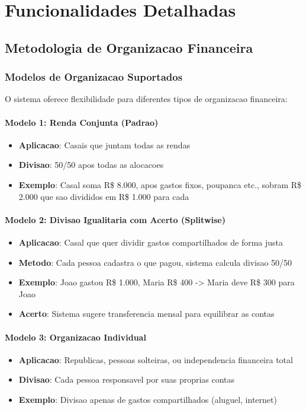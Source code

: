\section{Funcionalidades Detalhadas}

\subsection{Metodologia de Organizacao Financeira}

\subsubsection{Modelos de Organizacao Suportados}
O sistema oferece flexibilidade para diferentes tipos de organizacao financeira:

\paragraph{Modelo 1: Renda Conjunta (Padrao)}
\begin{itemize}
    \item \textbf{Aplicacao}: Casais que juntam todas as rendas
    \item \textbf{Divisao}: 50/50 apos todas as alocacoes
    \item \textbf{Exemplo}: Casal soma R\$ 8.000, apos gastos fixos, poupanca etc., sobram R\$ 2.000 que sao divididos em R\$ 1.000 para cada
\end{itemize}

\paragraph{Modelo 2: Divisao Igualitaria com Acerto (Splitwise)}
\begin{itemize}
    \item \textbf{Aplicacao}: Casal que quer dividir gastos compartilhados de forma justa
    \item \textbf{Metodo}: Cada pessoa cadastra o que pagou, sistema calcula divisao 50/50
    \item \textbf{Exemplo}: Joao gastou R\$ 1.000, Maria R\$ 400 -> Maria deve R\$ 300 para Joao
    \item \textbf{Acerto}: Sistema sugere transferencia mensal para equilibrar as contas
\end{itemize}

\paragraph{Modelo 3: Organizacao Individual}
\begin{itemize}
    \item \textbf{Aplicacao}: Republicas, pessoas solteiras, ou independencia financeira total
    \item \textbf{Divisao}: Cada pessoa responsavel por suas proprias contas
    \item \textbf{Exemplo}: Divisao apenas de gastos compartilhados (aluguel, internet)
\end{itemize}


